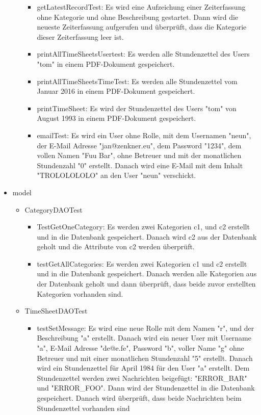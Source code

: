\begin{itemize}
\begin{itemize}
\begin{itemize}
              \item getLatestRecordTest: Es wird eine Aufzeichung einer Zeiterfassung ohne Kategorie und ohne Beschreibung gestartet. Dann wird die neueste Zeiterfassung aufgerufen und überprüft, dass die Kategorie dieser Zeiterfassung leer ist.
              \item printAllTimeSheetsUsertest: Es werden alle Stundenzettel des Users "tom" in einem PDF-Dokument gespeichert.
              \item printAllTimeSheetsTimeTest: Es werden alle Stundenzettel vom Januar 2016 in einem PDF-Dokument gespeichert.
              \item printTimeSheet: Es wird der Stundenzettel des Users "tom" von August 1993 in einem PDF-Dokument gespeichert.
              \item emailTest: Es wird ein User ohne Rolle, mit dem Usernamen "neun", der E-Mail Adresse "jan@zenkner.eu", dem Password "1234", dem vollen Namen "Fuu Bar", ohne Betreuer und mit der monatlichen Stundenzahl "0" erstellt. Danach wird eine E-Mail mit dem Inhalt "TROLOLOLOLO" an den User "neun" verschickt.
            \end{itemize}
        \end{itemize}
    \item model         
      \begin{itemize}
        \item CategoryDAOTest
          \begin{itemize}
            \item TestGetOneCategory: Es werden zwei Kategorien c1, und c2 erstellt und in die Datenbank gespeichert. Danach wird c2 aus der Datenbank geholt und die Attribute von c2 werden überprüft.
            \item testGetAllCategories: Es werden zwei Kategorien c1 und c2 erstellt und in die Datenbank gespeichert. Danach werden alle Kategorien aus der Datenbank geholt und dann überprüft, dass beide zuvor erstellten Kategorien vorhanden sind.
          \end{itemize}
        \item TimeSheetDAOTest
          \begin{itemize}
            \item testSetMessage: Es wird eine neue Rolle mit dem Namen "r", und der Beschreibung "a" erstellt. Danach wird ein neuer User mit Username "a", E-Mail Adresse "de@e.fe", Password "b", voller Name "g" ohne Betreuer und mit einer monatlichen Stundenzahl "5" erstellt. Danach wird ein Stundenzettel für April 1984 für den User "a" erstellt. Dem Stundenzettel werden zwei Nachrichten beigefügt: "ERROR_BAR" und "ERROR_FOO". Dann wird der Stundenzettel in die Datenbank gespeichert. Danach wird überprüft, dass beide Nachrichten beim Stundenzettel vorhanden sind

\end{itemize}
\end{itemize}
\end{itemize}
